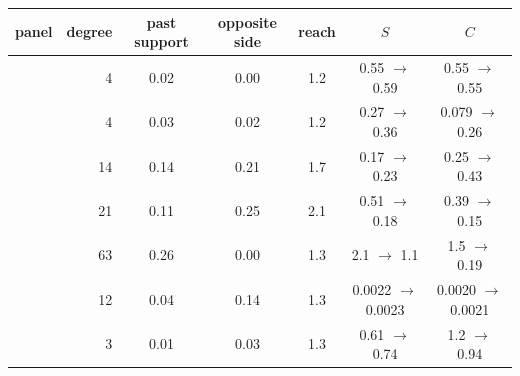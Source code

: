 \begin{tabular}{lrccccc}
\toprule
panel & degree & past support & opposite side & reach & $S$ & $C$ \\
\midrule
\vkg{} & 4 & 0.02 & 0.00 & 1.2 & 0.55 $\to$ 0.59 & 0.55 $\to$ 0.55 \\
\vkc{} & 4 & 0.03 & 0.02 & 1.2 & 0.27 $\to$ 0.36 & 0.079 $\to$ 0.26 \\
\senate{} & 14 & 0.14 & 0.21 & 1.7 & 0.17 $\to$ 0.23 & 0.25 $\to$ 0.43 \\
\house{} & 21 & 0.11 & 0.25 & 2.1 & 0.51 $\to$ 0.18 & 0.39 $\to$ 0.15 \\
\cmv{} & 63 & 0.26 & 0.00 & 1.3 & 2.1 $\to$ 1.1 & 1.5 $\to$ 0.19 \\
\kozitsin{} & 12 & 0.04 & 0.14 & 1.3 & 0.0022 $\to$ 0.0023 & 0.0020 $\to$ 0.0021 \\
\markets{} & 3 & 0.01 & 0.03 & 1.3 & 0.61 $\to$ 0.74 & 1.2 $\to$ 0.94 \\
\bottomrule
\end{tabular}
